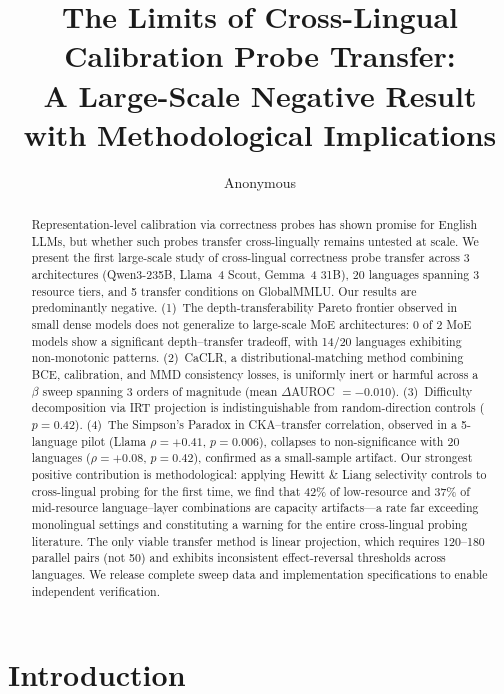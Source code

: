 \documentclass[11pt,a4paper]{article}
\title{The Limits of Cross-Lingual Calibration Probe Transfer:\\A Large-Scale Negative Result with Methodological Implications}
\author{Anonymous}
\newcommand{\auroc}{AUROC}
\begin{document}
\maketitle

\begin{abstract}
Representation-level calibration via correctness probes has shown promise for English LLMs, but whether such probes transfer cross-lingually remains untested at scale.
We present the first large-scale study of cross-lingual correctness probe transfer across 3 architectures (Qwen3-235B, Llama~4 Scout, Gemma~4 31B), 20 languages spanning 3 resource tiers, and 5 transfer conditions on GlobalMMLU.
Our results are predominantly negative.
(1)~The depth-transferability Pareto frontier observed in small dense models does not generalize to large-scale MoE architectures: 0 of 2 MoE models show a significant depth--transfer tradeoff, with 14/20 languages exhibiting non-monotonic patterns.
(2)~CaCLR, a distributional-matching method combining BCE, calibration, and MMD consistency losses, is uniformly inert or harmful across a $\beta$ sweep spanning 3 orders of magnitude (mean $\Delta$\auroc{} $= -0.010$).
(3)~Difficulty decomposition via IRT projection is indistinguishable from random-direction controls ($p = 0.42$).
(4)~The Simpson's Paradox in CKA--transfer correlation, observed in a 5-language pilot (Llama $\rho = +0.41$, $p = 0.006$), collapses to non-significance with 20 languages ($\rho = +0.08$, $p = 0.42$), confirmed as a small-sample artifact.
Our strongest positive contribution is methodological: applying Hewitt \& Liang selectivity controls to cross-lingual probing for the first time, we find that 42\% of low-resource and 37\% of mid-resource language--layer combinations are capacity artifacts---a rate far exceeding monolingual settings and constituting a warning for the entire cross-lingual probing literature.
The only viable transfer method is linear projection, which requires 120--180 parallel pairs (not 50) and exhibits inconsistent effect-reversal thresholds across languages.
We release complete sweep data and implementation specifications to enable independent verification.
\end{abstract}

\section{Introduction}
\label{sec:intro}
\end{document}
